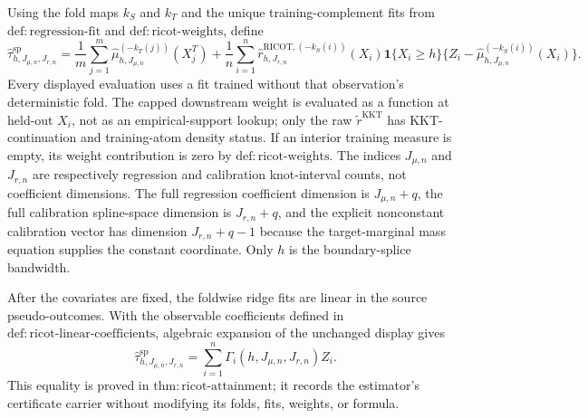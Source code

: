 Using the fold maps \(k_S\) and \(k_T\) and the unique training-complement fits from \(\mathrm{def:regression\text{-}fit}\) and \(\mathrm{def:ricot\text{-}weights}\), define
\[
\widehat\tau^{\mathrm{sp}}_{h,J_{\mu,n},J_{r,n}}=
\frac1m\sum_{j=1}^m\widehat\mu_{h,J_{\mu,n}}^{(-k_T(j))}(X_j^T)
+\frac1n\sum_{i=1}^n\widehat r^{\mathrm{RICOT},(-k_S(i))}_{h,J_{r,n}}(X_i)\mathbf 1\{X_i\ge h\}\{Z_i-\widehat\mu_{h,J_{\mu,n}}^{(-k_S(i))}(X_i)\}.
\]
Every displayed evaluation uses a fit trained without that observation's deterministic fold. The capped downstream weight is evaluated as a function at held-out \(X_i\), not as an empirical-support lookup; only the raw \(\widetilde r^{\mathrm{KKT}}\) has KKT-continuation and training-atom density status. If an interior training measure is empty, its weight contribution is zero by \(\mathrm{def:ricot\text{-}weights}\). The indices \(J_{\mu,n}\) and \(J_{r,n}\) are respectively regression and calibration knot-interval counts, not coefficient dimensions. The full regression coefficient dimension is \(J_{\mu,n}+q\), the full calibration spline-space dimension is \(J_{r,n}+q\), and the explicit nonconstant calibration vector has dimension \(J_{r,n}+q-1\) because the target-marginal mass equation supplies the constant coordinate. Only \(h\) is the boundary-splice bandwidth.

After the covariates are fixed, the foldwise ridge fits are linear in the source pseudo-outcomes. With the observable coefficients defined in \(\mathrm{def:ricot\text{-}linear\text{-}coefficients}\), algebraic expansion of the unchanged display gives
\[
\widehat\tau^{\mathrm{sp}}_{h,J_{\mu,n},J_{r,n}}=\sum_{i=1}^n\Gamma_i(h,J_{\mu,n},J_{r,n})Z_i.
\]
This equality is proved in \(\mathrm{thm:ricot\text{-}attainment}\); it records the estimator's certificate carrier without modifying its folds, fits, weights, or formula.